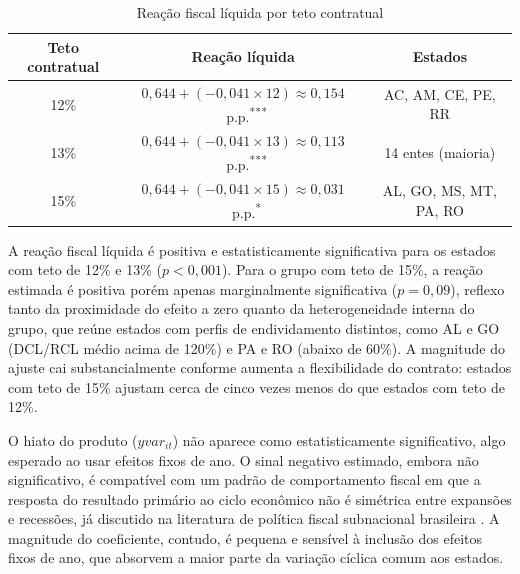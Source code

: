 \vspace{0.8cm}
\begin{table}[H]
\centering
\caption{Reação fiscal líquida por teto contratual}
\label{tab:reacao_liquida}
\begin{tabular*}{\textwidth}{@{\extracolsep{\fill}}ccc}
\toprule
Teto contratual & Reação líquida & Estados \\
\midrule
12\% & $0{,}644 + (-0{,}041 \times 12) \approx 0{,}154$~p.p.\textsuperscript{***}
     & AC, AM, CE, PE, RR \\
13\% & $0{,}644 + (-0{,}041 \times 13) \approx 0{,}113$~p.p.\textsuperscript{***}
     & 14 entes (maioria) \\
15\% & $0{,}644 + (-0{,}041 \times 15) \approx 0{,}031$~p.p.\textsuperscript{*}
     & AL, GO, MS, MT, PA, RO \\
\bottomrule
\end{tabular*}
\end{table}
\vspace{0.8cm}

A reação fiscal líquida é positiva e estatisticamente significativa para os estados com teto de 12\% e 13\% ($p < 0{,}001$). Para o grupo com teto de 15\%, a reação estimada é positiva porém apenas marginalmente significativa ($p = 0{,}09$), reflexo tanto da proximidade do efeito a zero quanto da heterogeneidade interna do grupo, que reúne estados com perfis de endividamento distintos, como AL e GO (DCL/RCL médio acima de 120\%) e PA e RO (abaixo de 60\%). A magnitude do ajuste cai substancialmente conforme aumenta a flexibilidade do contrato: estados com teto de 15\% ajustam cerca de cinco vezes menos do que estados com teto de 12\%.

O hiato do produto ($yvar_{it}$) não aparece como estatisticamente significativo, algo esperado ao usar efeitos fixos de ano. O sinal negativo estimado, embora não significativo, é compatível com um padrão de comportamento fiscal em que a resposta do resultado primário ao ciclo econômico não é simétrica entre expansões e recessões, já discutido na literatura de política fiscal subnacional brasileira \cite{moraFederalismoEndividamentoSubnacional2007}. A magnitude do coeficiente, contudo, é pequena e sensível à inclusão dos efeitos fixos de ano, que absorvem a maior parte da variação cíclica comum aos estados.

